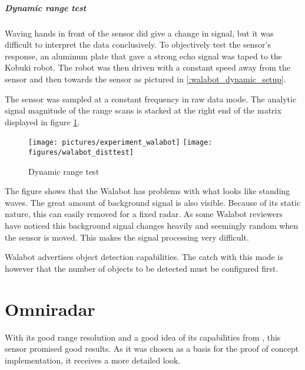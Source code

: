 \subparagraph{Dynamic range test}\label{dynamic-range-test}

Waving hands in front of the sensor did give a change in signal, but it
was difficult to interpret the data conclusively. To objectively test
the sensor's response, an aluminum plate that gave a strong echo signal
was taped to the Kobuki robot. The robot was then driven with a constant
speed away from the sensor and then towards the sensor as pictured in
\ref{:walabot_dynamic_setup}.

The sensor was sampled at a constant frequency in raw data mode. The
analytic signal magnitude of the range scans is stacked at the right end of the
matrix displayed in figure \ref{fig:walabot_dynamic_data}.


\begin{figure}[htp]
    \centering
        {\texttt{[image: pictures/experiment\_walabot]}}
        \label{fig:walabot_dynamic_setup}
    \quad
        {\texttt{[image: figures/walabot\_disttest]}}
        \label{fig:walabot_dynamic_data}
    \caption{Dynamic range test}
\end{figure}

The figure shows that the Walabot has problems with what looks like
standing waves. The great amount of background signal is also visible.
Because of its static nature, this can easily removed for a fixed radar.
As some Walabot reviewers have noticed \cite{Valens2016} this background
signal changes heavily and seemingly random when the sensor is moved.
This makes the signal processing very difficult.

Walabot advertises object detection capabilities. The catch with this
mode is however that the number of objects to be detected must be
configured first.

\section{Omniradar}\label{omniradar}

With its good range resolution and a good idea of its capabilities from
\cite{Ernst2016}, this sensor promised good results. As it was chosen as
a basis for the proof of concept implementation, it receives a more
detailed look.


